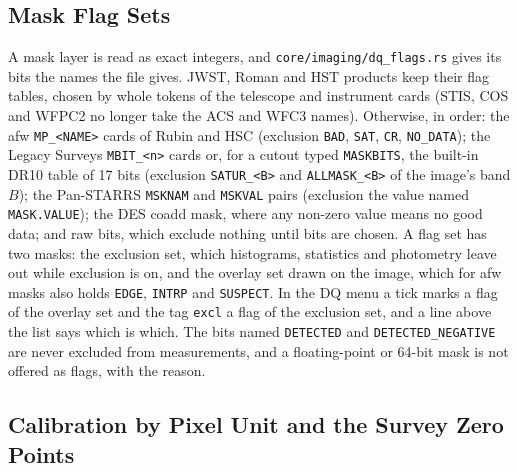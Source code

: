 \documentclass[11pt,a4paper]{article}
\newcommand{\code}[1]{\texttt{\small #1}}
\begin{document}
    \subsection{Mask Flag Sets}
    \label{sec:flagsets}

    A mask layer is read as exact integers, and \code{core/\allowbreak imaging/\allowbreak dq\_flags.rs} gives its bits the names the file gives. JWST, Roman and HST products keep their flag tables, chosen by whole tokens of the telescope and instrument cards (STIS, COS and WFPC2 no longer take the ACS and WFC3 names). Otherwise, in order: the afw \code{MP\_<NAME>} cards of Rubin and HSC (exclusion \code{BAD}, \code{SAT}, \code{CR}, \code{NO\_DATA}); the Legacy Surveys \code{MBIT\_<n>} cards or, for a cutout typed \code{MASKBITS}, the built-in DR10 table of 17 bits (exclusion \code{SATUR\_<B>} and \code{ALLMASK\_<B>} of the image's band $B$); the Pan-STARRS \code{MSKNAM} and \code{MSKVAL} pairs (exclusion the value named \code{MASK.VALUE}); the DES coadd mask, where any non-zero value means no good data; and raw bits, which exclude nothing until bits are chosen. A flag set has two masks: the exclusion set, which histograms, statistics and photometry leave out while exclusion is on, and the overlay set drawn on the image, which for afw masks also holds \code{EDGE}, \code{INTRP} and \code{SUSPECT}. In the DQ menu a tick marks a flag of the overlay set and the tag \code{excl} a flag of the exclusion set, and a line above the list says which is which. The bits named \code{DETECTED} and \code{DETECTED\_\allowbreak NEGATIVE} are never excluded from measurements, and a floating-point or 64-bit mask is not offered as flags, with the reason.

    \subsection{Calibration by Pixel Unit and the Survey Zero Points}
    \label{sec:survey_cal}
\end{document}
